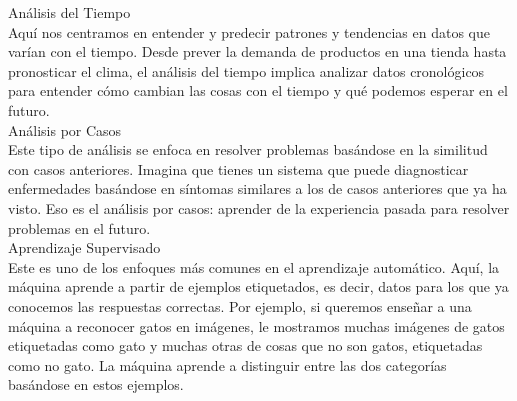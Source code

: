\noindent \textcolor{Contraste4}{Análisis del Tiempo}\\

Aquí nos centramos en entender y predecir patrones y tendencias en datos que varían 
con el tiempo. Desde prever la demanda de productos en una tienda hasta pronosticar 
el clima, el análisis del tiempo implica analizar datos cronológicos para entender 
cómo cambian las cosas con el tiempo y qué podemos esperar en el futuro.\\


\noindent \textcolor{Contraste4}{Análisis por Casos}\\

Este tipo de análisis se enfoca en resolver problemas basándose en la similitud con 
casos anteriores. Imagina que tienes un sistema que puede diagnosticar enfermedades 
basándose en síntomas similares a los de casos anteriores que ya ha visto. Eso es 
el análisis por casos: aprender de la experiencia pasada para resolver 
problemas en el futuro.\\ 


\noindent \textcolor{Contraste4}{Aprendizaje Supervisado}\\

Este es uno de los enfoques más comunes en el aprendizaje automático. Aquí, la máquina 
aprende a partir de ejemplos etiquetados, es decir, datos para los que ya conocemos 
las respuestas correctas. Por ejemplo, si queremos enseñar a una máquina a reconocer 
gatos en imágenes, le mostramos muchas imágenes de gatos etiquetadas como gato y 
muchas otras de cosas que no son gatos, etiquetadas como no gato. La máquina aprende 
a distinguir entre las dos categorías basándose en estos ejemplos.
